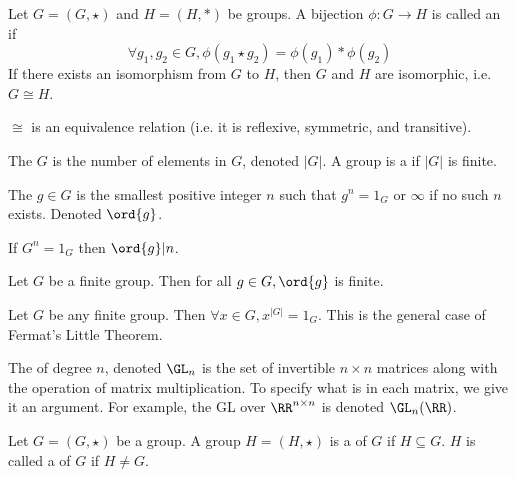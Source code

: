 \documentclass{article}
\begin{document}
\begin{defn}
  Let $G = (G, \star)$ and $H = (H, *)$ be groups. A bijection
  $\phi : G \rightarrow H$ is called an  if
  $$\forall g_1, g_2 \in G, \phi(g_1 \star g_2) = \phi(g_1) * \phi(g_2)$$
  If there exists an isomorphism from $G$ to $H$, then $G$ and $H$ are isomorphic,
  i.e. $G \cong H$. 
\end{defn}

\begin{remark}
  $\cong$ is an equivalence relation (i.e. it is reflexive, symmetric, and transitive). 
\end{remark}

\begin{defn}
  The  $G$ is the number of elements in $G$, denoted $|G|$.
  A group is a  if $|G|$ is finite.
\end{defn}

\begin{defn}
  The  $g \in G$ is the smallest positive integer $n$
  such that $g^n = 1_G$ or $\infty$ if no such $n$ exists. Denoted $\ord{g}$. 
\end{defn}

\begin{fact}
  If $G^n = 1_G$ then $\ord{g} | n$. 
\end{fact}

\begin{fact}
  Let $G$ be a finite group. Then for all $g \in G, \ord{g}$ is finite.
\end{fact}

\begin{nthm}
  Let $G$ be any finite group. Then $\forall x \in G, x^{|G|} = 1_G$.
  This is the general case of Fermat's Little Theorem. 
\end{nthm}

\begin{defn}
  The  of degree $n$, denoted $\GL_n$ is the set of
  invertible $n \times n$ matrices along with the operation of matrix
  multiplication. To specify what is in each matrix, we give it an argument.
  For example, the GL over $\RR^{n \times n}$ is denoted $\GL_n(\RR)$. 
\end{defn}

\begin{defn}
  Let $G = (G, \star)$ be a group. A group $H = (H, \star)$ is a
   of $G$ if $H \subseteq G$. $H$ is called a 
  of $G$ if $H \neq G$. 
\end{defn}
\end{document}
